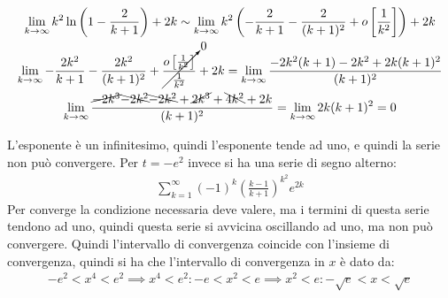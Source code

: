 \documentclass{article}
\numberwithin{equation}{subsection}
\begin{document}
\begin{gather*}
    \displaystyle\lim_{k\to\infty}k^2\ln\left(1-\frac{2}{k+1}\right)+2k\sim
    \lim_{k\to\infty}k^2\left(-\frac{2}{k+1}-\frac{2}{(k+1)^2}+o\left[\frac{1}{k^2}\right]\right)+2k\\
    \lim_{k\to\infty}-\frac{2k^2}{k+1}-\frac{2k^2}{(k+1)^2}+\cancelto{0}{\frac{o\left[\frac{1}{k^2}\right]}{\frac{1}{k^2}}}+2k=
    \lim_{k\to\infty}\frac{-2k^2(k+1)-2k^2+2k(k+1)^2}{(k+1)^2}\\
    \lim_{k\to\infty}\frac{\cancel{-2k^3}\bcancel{-2k^2}\bcancel{-2k^2}+\cancel{2k^3}+\bcancel{4k^2}+2k}{(k+1)^2}=
    \lim_{k\to\infty}{2k}{(k+1)^2}=0
\end{gather*}

L'esponente è un infinitesimo, quindi l'esponente tende ad uno, e quindi la serie non può convergere. Per $t=-e^2$ invece si ha una serie di segno alterno:
\begin{gather*}
    \displaystyle\sum_{k=1}^\infty(-1)^k\left(\frac{k-1}{k+1}\right)^{k^2}e^{2k}
\end{gather*}
Per converge la condizione necessaria deve valere, ma i termini di questa serie tendono ad uno, quindi questa serie si avvicina oscillando ad uno, ma non può convergere. Quindi l'intervallo di convergenza coincide con l'insieme di convergenza, quindi si ha che l'intervallo di convergenza in $x$ è dato da:
\begin{gather*}
    -e^2<x^4<e^2\implies x^4<e^2:-e<x^2<e\implies x^2<e:-\sqrt{e}<x<\sqrt{e}
\end{gather*}



\end{document}
